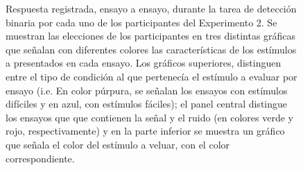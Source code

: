 \begin{figure}[th]
\caption[Respuesta binaria registrada ensayo a ensayo en relación con el tipo de estímulo a evaluar; Experimento 2]{Respuesta registrada, ensayo a ensayo, durante la tarea de detección binaria por cada uno de los participantes del Experimento 2. Se muestran las elecciones de los participantes en tres distintas gráficas que señalan con diferentes colores las características de los estímulos a presentados en cada ensayo. Los gráficos superiores, distinguen entre el tipo de condición al que pertenecía el estímulo a evaluar por ensayo (i.e. En color púrpura, se señalan los ensayos con estímulos difíciles y en azul, con estímulos fáciles); el panel central distingue los ensayos que que contienen la señal y el ruido (en colores verde y rojo, respectivamente) y en la parte inferior se muestra un gráfico que señala el color del estímulo a veluar, con el color correspondiente.}
\label{fig:BiasResp_E1}
\end{figure}

